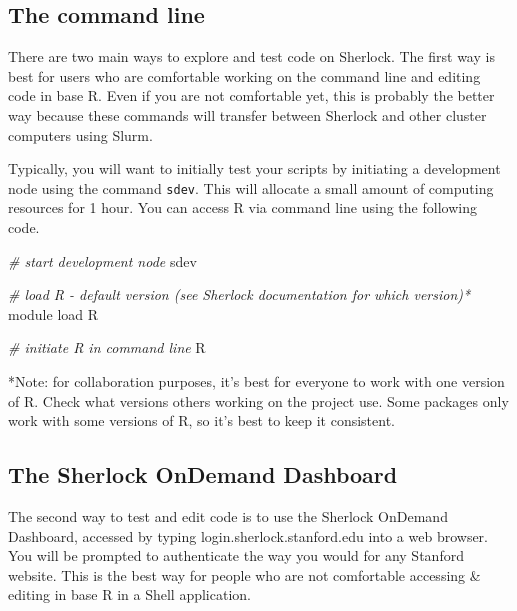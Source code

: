 \documentclass[
]{book}
\newenvironment{Shaded}{\begin{snugshade}}{\end{snugshade}}
\newcommand{\CommentTok}[1]{\textcolor[rgb]{0.56,0.35,0.01}{\textit{#1}}}
\newcommand{\ExtensionTok}[1]{#1}
\newcommand{\NormalTok}[1]{#1}
\begin{document}
\hypertarget{the-command-line}{%
\subsection{The command line}\label{the-command-line}}

There are two main ways to explore and test code on Sherlock. The first way is best for users who are comfortable working on the command line and editing code in base R. Even if you are not comfortable yet, this is probably the better way because these commands will transfer between Sherlock and other cluster computers using Slurm.

Typically, you will want to initially test your scripts by initiating a development node using the command \texttt{sdev}. This will allocate a small amount of computing resources for 1 hour. You can access R via command line using the following code.

\begin{Shaded}
\begin{Highlighting}[]
\CommentTok{\# start development node}
\ExtensionTok{sdev}

\CommentTok{\# load R {-} default version (see Sherlock documentation for which version)*}
\ExtensionTok{module}\NormalTok{ load R}

\CommentTok{\# initiate R in command line}
\ExtensionTok{R}
\end{Highlighting}
\end{Shaded}

*Note: for collaboration purposes, it's best for everyone to work with one version of R. Check what versions others working on the project use. Some packages only work with some versions of R, so it's best to keep it consistent.

\hypertarget{the-sherlock-ondemand-dashboard}{%
\subsection{The Sherlock OnDemand Dashboard}\label{the-sherlock-ondemand-dashboard}}

The second way to test and edit code is to use the Sherlock OnDemand Dashboard, accessed by typing login.sherlock.stanford.edu into a web browser. You will be prompted to authenticate the way you would for any Stanford website. This is the best way for people who are not comfortable accessing \& editing in base R in a Shell application.
\end{document}
